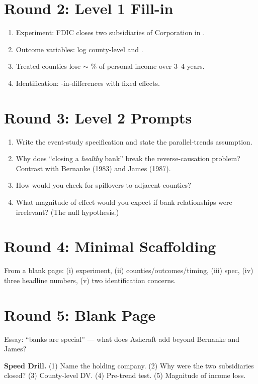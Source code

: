 \documentclass[11pt]{article}
\newcommand{\blank}[1]{\underline{\hspace{#1}}}
\begin{document}
\section*{Round 2: Level 1 Fill-in}
\begin{enumerate}
\item Experiment: FDIC closes two \blank{2cm} subsidiaries of \blank{2cm} Corporation in \blank{2cm}.
\item Outcome variables: log county-level \blank{2cm} and \blank{2cm}.
\item Treated counties lose $\sim$ \blank{1cm}\% of personal income over 3--4 years.
\item Identification: \blank{2cm}-in-differences with \blank{2cm} fixed effects.
\end{enumerate}

\section*{Round 3: Level 2 Prompts}
\begin{enumerate}
\item Write the event-study specification and state the parallel-trends assumption.
\item Why does ``closing a \emph{healthy} bank'' break the reverse-causation problem? Contrast with Bernanke (1983) and James (1987).
\item How would you check for spillovers to adjacent counties?
\item What magnitude of effect would you expect if bank relationships were irrelevant? (The null hypothesis.)
\end{enumerate}

\section*{Round 4: Minimal Scaffolding}
From a blank page: (i) experiment, (ii) counties/outcomes/timing, (iii) spec, (iv) three headline numbers, (v) two identification concerns.

\section*{Round 5: Blank Page}
Essay: ``banks are special'' --- what does Ashcraft add beyond Bernanke and James?

\vspace{6pt}
\begin{drillbox}
\textbf{Speed Drill.} (1) Name the holding company. (2) Why were the two subsidiaries closed? (3) County-level DV. (4) Pre-trend test. (5) Magnitude of income loss.
\end{drillbox}
\end{document}
